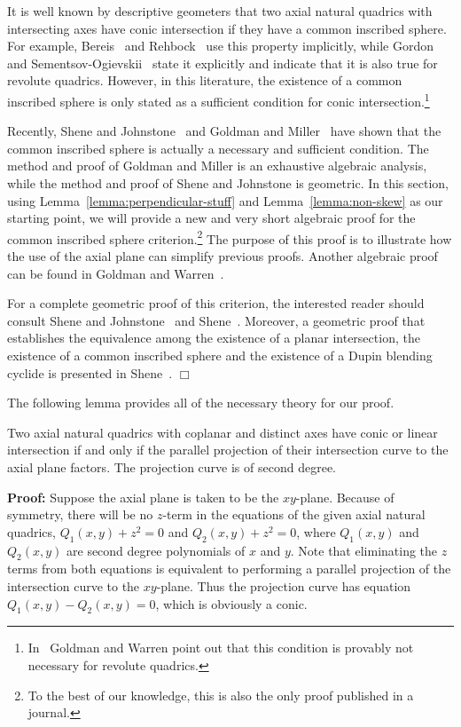      It is well known by descriptive geometers that two axial natural
quadrics with intersecting axes have conic intersection if they have a
common inscribed sphere.  For example, Bereis~\cite{bereis:1964} and
Rehbock~\cite{rehbock:1964} use this property implicitly, while
Gordon and Sementsov-Ogievskii~\cite[p. 283]{gordon:1980} state
it explicitly and indicate that it is also true for revolute quadrics.
However, in this literature,
the existence of a common inscribed sphere is only
stated as a sufficient condition for conic
intersection.\footnote{In~\cite{goldman-warren:1990} Goldman and Warren
point out that this condition is provably not necessary for revolute
quadrics.}

     Recently, Shene and Johnstone~\cite{shene-johnstone:1991a} and Goldman and
Miller~\cite{g-m:1990,g-m:1991a} have shown that
the common inscribed sphere is
actually a necessary and sufficient condition.  The method and proof of
Goldman and Miller is an exhaustive algebraic analysis, while the method and
proof of Shene and Johnstone is geometric.
In this section, using Lemma~\ref{lemma:perpendicular-stuff} and
Lemma~\ref{lemma:non-skew} as our starting point, we will provide a new and
very short algebraic proof for the common inscribed sphere
criterion.\footnote{To the best of our knowledge, this is also the only proof
published in a journal.}
The purpose of this proof is to illustrate how the use of the axial plane
can simplify previous proofs.
Another algebraic proof can be found in Goldman and
Warren~\cite{goldman-warren:1990}.

\begin{remark}\rm
     For a complete geometric proof of this criterion, the interested reader
should consult Shene and Johnstone~\cite{shene-johnstone:1991b} and
Shene~\cite{shene:1992}.  Moreover, a geometric proof that establishes the
equivalence among the existence of a planar intersection, the existence of a
common inscribed sphere and the existence of a Dupin blending cyclide is
presented in Shene~\cite{shene:1992,shene:1993a}. $\Box$
\end{remark}

     The following lemma provides all of the necessary theory for our proof.

\begin{lemma}
\label{lemma:factor}
     Two axial natural quadrics with coplanar and distinct axes have conic or
linear intersection if and only if the parallel projection of their
intersection curve to the axial plane factors.
The projection curve is of second degree.
\end{lemma}
{\bf Proof:}  Suppose the axial plane is taken to be the $xy$-plane.
Because of symmetry, there will be no $z$-term in the equations of the given
axial natural quadrics, $Q_1(x,y)+z^2=0$ and $Q_2(x,y)+z^2=0$,
where $Q_1(x,y)$ and $Q_2(x,y)$ are second degree polynomials of $x$ and $y$.
Note that eliminating the $z$ terms from both equations is equivalent to
performing a parallel projection of the intersection curve to the
$xy$-plane.  Thus the projection curve
has equation $Q_1(x,y)-Q_2(x,y)=0$, which is obviously a conic.

